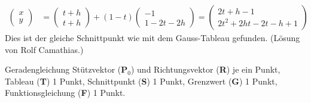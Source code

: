 \begin{loesung}
\begin{align*}
\begin{pmatrix}x\\y \end{pmatrix}
&=
\begin{pmatrix}t+h\\t+h\end{pmatrix}
+(1-t)
\begin{pmatrix}-1\\1-2t-2h\end{pmatrix}
=
\begin{pmatrix}
2t+h-1\\
2t^2+2ht-2t-h+1
\end{pmatrix}
\end{align*}
Dies ist der gleiche Schnittpunkt wie mit dem Gauss-Tableau gefunden.
(Lösung von Rolf Camathias.)
\qedhere
\end{loesung}

\begin{bewertung}
Geradengleichung Stützvektor ({\bf P$_0$}) und Richtungsvektor ({\bf R})
je ein Punkt,
Tableau ({\bf T}) 1 Punkt, Schnittpunkt ({\bf S}) 1 Punkt,
Grenzwert ({\bf G}) 1 Punkt,
Funktionsgleichung ({\bf F}) 1 Punkt.
\end{bewertung}

